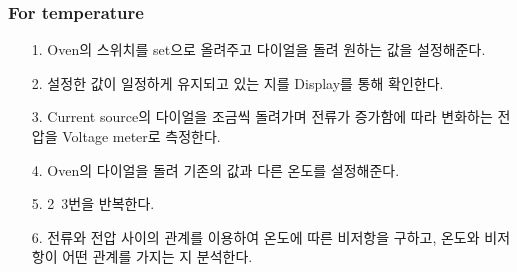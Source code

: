 \documentclass[aps,reprint,superscriptaddress,10pt]{revtex4-2}
\begin{document}
\subsubsection{For temperature}
\begin{itemize}
    \item[1. ]
    Oven의 스위치를 set으로 올려주고 다이얼을 돌려 원하는 값을 설정해준다.
    \item[2. ]
    설정한 값이 일정하게 유지되고 있는 지를 Display를 통해 확인한다. 
    \item[3. ]
    Current source의 다이얼을 조금씩 돌려가며 전류가 증가함에 따라 변화하는 전압을 
    Voltage meter로 측정한다. 
    \item[4. ]
    Oven의 다이얼을 돌려 기존의 값과 다른 온도를 설정해준다.
    \item[5. ]
    2~3번을 반복한다. 
    \item[6. ]
    전류와 전압 사이의 관계를 이용하여 온도에 따른 비저항을 구하고, 
    온도와 비저항이 어떤 관계를 가지는 지 분석한다.

\end{itemize}
\nocite{*} 





\vfill
\end{document}
